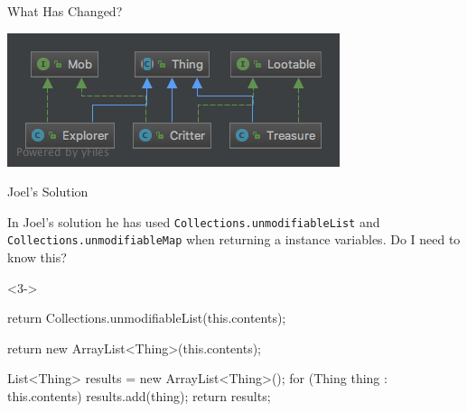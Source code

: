 \documentclass[12]{beamer}
\begin{document}
\begin{frame}[t]{What Has Changed?} \vspace{4pt}
\begin{center}
\includegraphics[scale=0.45]{old_classes}\\[20pt]
\end{center}
\end{frame}

\begin{frame}[t, fragile]{Joel's Solution} \vspace{4pt}

In Joel's solution he has used \texttt{Collections.unmodifiableList} and \texttt{Collections.unmodifiableMap} when returning a instance variables. Do I need to know this?


\begin{onlyenv}<3->
\begin{java}
return Collections.unmodifiableList(this.contents);

return new ArrayList<Thing>(this.contents);

List<Thing> results = new ArrayList<Thing>();
for (Thing thing : this.contents) {
	results.add(thing);
}
return results;
\end{java}
\end{onlyenv}

\end{frame}
\end{document}
